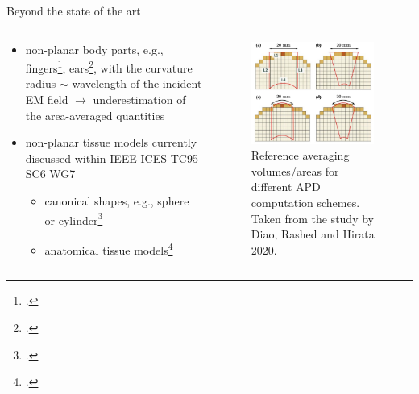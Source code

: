 \documentclass[xcolor=dvipsnames,10pt]{beamer}
\begin{document}
\begin{frame}{Beyond the state of the art}
    \begin{columns}[c]
        \begin{column}{0.5\textwidth}
            \begin{itemize}
                \item non-planar body parts, e.g., fingers\footcite{Li2012Mechanisms}, ears\footcite{Sacco2022Exposure}, with the curvature radius $\sim$ wavelength of the incident EM field $\rightarrow$ underestimation of the area-averaged quantities
                \item non-planar tissue models currently discussed within IEEE ICES TC95 SC6 WG7
                \begin{itemize}
                    \item canonical shapes, e.g., sphere or cylinder\footcite{Diao2020Assessment,Kapetanovic2022AssessmentTEMC}
                    \item anatomical tissue models\footcite{Kapetanovic2022AssessmentJERM}
                \end{itemize}
            \end{itemize}
        \end{column}
        \begin{column}{0.5\textwidth}
            \begin{center}
            \begin{figure}
                \includegraphics[width=0.95\textwidth]{figures/Diao2020Figure2_adjusted.pdf}
                \caption{Reference averaging volumes/areas for different APD computation schemes. Taken from the study by Diao, Rashed and Hirata 2020.}
            \end{figure}
            \end{center}
        \end{column}
    \end{columns}
\end{frame}
\end{document}
